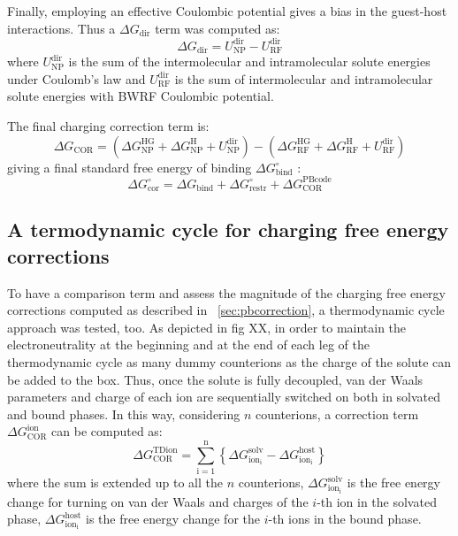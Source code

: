 \documentclass[11pt,oneside,a4paper]{article}
\begin{document}
Finally, employing an effective Coulombic potential gives a bias in the guest-host interactions. Thus a $\Delta G_\mathrm{dir}$ term was computed as:
\begin{equation}
 \label{eq:DGDIR}
 \Delta G_\mathrm{dir} = U_\mathrm{NP}^\mathrm{dir} - U_\mathrm{RF}^\mathrm{dir}
\end{equation}
where $U_\mathrm{NP}^\mathrm{dir}$ is the sum of the intermolecular and intramolecular solute energies under Coulomb's law and $U_\mathrm{RF}^\mathrm{dir}$ is the sum of intermolecular and intramolecular solute energies with BWRF Coulombic potential.

The final charging correction term is:
\begin{equation}
 \label{eq:DGCOR}
 \Delta G_\mathrm{COR}= (\Delta G_\mathrm{NP}^\mathrm{HG} + \Delta G_\mathrm{NP}^\mathrm{H} + U_\mathrm{NP}^\mathrm{dir} ) - (\Delta G_\mathrm{RF}^\mathrm{HG} + \Delta G_\mathrm{RF}^\mathrm{H} + U_\mathrm{RF}^\mathrm{dir} ) 
\end{equation}
giving a final standard free energy of binding $\Delta G_\mathrm{bind}^{\circ}$ :
\begin{equation}
 \label{eq:DGBINDCOR}
 \Delta G_\mathrm{cor}^\circ= \Delta G_\mathrm{bind} + \Delta G_\mathrm{restr}^\circ + \Delta G_\mathrm{COR}^\mathrm{PBcode}
\end{equation}


\subsection{A termodynamic cycle for charging free energy corrections}
\label{sec:tdcorrection}

To have a comparison term and assess the magnitude of the charging free energy corrections computed as described in ~\ref{sec:pbcorrection}, a thermodynamic cycle approach was tested, too. As depicted in fig XX, in order to maintain the electroneutrality at the beginning and at the end of each leg of the thermodynamic cycle as many dummy counterions as the charge of the solute can be added to the box. Thus, once the solute is fully decoupled, van der Waals parameters and charge of each ion are sequentially switched on both in solvated and bound phases. In this way, considering $n$ counterions, a correction term $\Delta G_\mathrm{COR}^\mathrm{ion}$ can be computed as:
\begin{equation}
 \label{eq:DGCORion}
 \Delta G_\mathrm{COR}^\mathrm{TDion} =\sum_\mathrm{i=1}^\mathrm{n} \left\{ \Delta G_\mathrm{ion_i}^\mathrm{solv} - \Delta G_\mathrm{ion_i}^\mathrm{host} \right\}%
\end{equation}
where the sum is extended up to all the $n$ counterions,
$\Delta G_\mathrm{ion_i}^\mathrm{solv}$ is the free energy change for turning on van der Waals and charges of the $i$-th ion in the solvated phase, $\Delta G_\mathrm{ion_i}^\mathrm{host}$ is the free energy change for the $i$-th ions in the bound phase.
\end{document}
